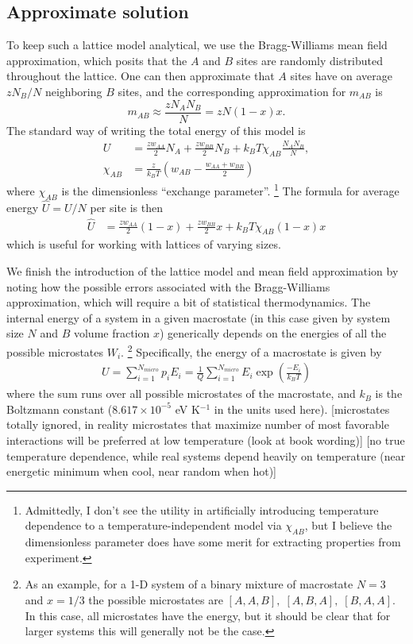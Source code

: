 \documentclass[10pt]{article}
\begin{document}
\subsection{Approximate solution}
To keep such a lattice model analytical, we use the Bragg-Williams mean field approximation, which posits that the $A$ and $B$ sites are randomly distributed throughout the lattice.
One can then approximate that $A$ sites have on average $z N_B / N$ neighboring $B$ sites, and the corresponding approximation for $m_{AB}$ is
\begin{equation}
    m_{AB} \approx \frac{z N_A N_B}{N} = z N (1-x) x.
\end{equation}
The standard way of writing the total energy of this model is
\begin{align}
    U &=
    \frac{z w_{AA}}{2} N_A +
    \frac{z w_{BB}}{2} N_B +
    k_B T \chi_{AB} \frac{N_A N_B}{N}, \\
    \chi_{AB} &=
    \frac{z}{k_B T} \left( w_{AB} - \frac{w_{AA} + w_{BB}}{2} \right)
\end{align}
where $\chi_{AB}$ is the dimensionless ``exchange parameter''. \footnote{Admittedly, I don't see the utility in artificially introducing temperature dependence to a temperature-independent model via $\chi_{AB}$, but I believe the dimensionless parameter does have some merit for extracting properties from experiment.}
The formula for average energy $\hat{U}=U/N$ per site is then
\begin{align}
    \hat{U} &=
    \frac{z w_{AA}}{2} (1-x) +
    \frac{z w_{BB}}{2} x +
    k_B T \chi_{AB} (1-x) x
\end{align}
which is useful for working with lattices of varying sizes.

We finish the introduction of the lattice model and mean field approximation by noting how the possible errors associated with the Bragg-Williams approximation, which will require a bit of statistical thermodynamics.
The internal energy of a system in a given macrostate (in this case given by system size $N$ and $B$ volume fraction $x$) generically depends on the energies of all the possible microstates $W_i$. \footnote{As an example, for a 1-D system of a binary mixture of macrostate $N=3$ and $x=1/3$ the possible microstates are $[A,A,B],\; [A,B,A],\; [B,A,A]$. In this case, all microstates have the energy, but it should be clear that for larger systems this will generally not be the case.}
Specifically, the energy of a macrostate is given by
\begin{align}
    U = \sum_{i=1}^{N_{micro}} p_i E_i
    = \frac{1}{Q} \sum_{i=1}^{N_{micro}} E_i \exp\left(\frac{-E_i}{k_B T}\right)
\end{align}
where the sum runs over all possible microstates of the macrostate, and $k_B$ is the Boltzmann constant ($8.617 \times 10^{-5}$ eV K$^{-1}$ in the units used here).
[microstates totally ignored, in reality microstates that maximize number of most favorable interactions will be preferred at low temperature (look at book wording)]
[no true temperature dependence, while real systems depend heavily on temperature (near energetic minimum when cool, near random when hot)]
\end{document}
